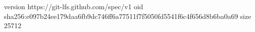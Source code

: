 version https://git-lfs.github.com/spec/v1
oid sha256:e097b24ee179daa6fb9dc746ff6a77511f7f5050fd5541f6c4f656d8b6ba0a69
size 25712
